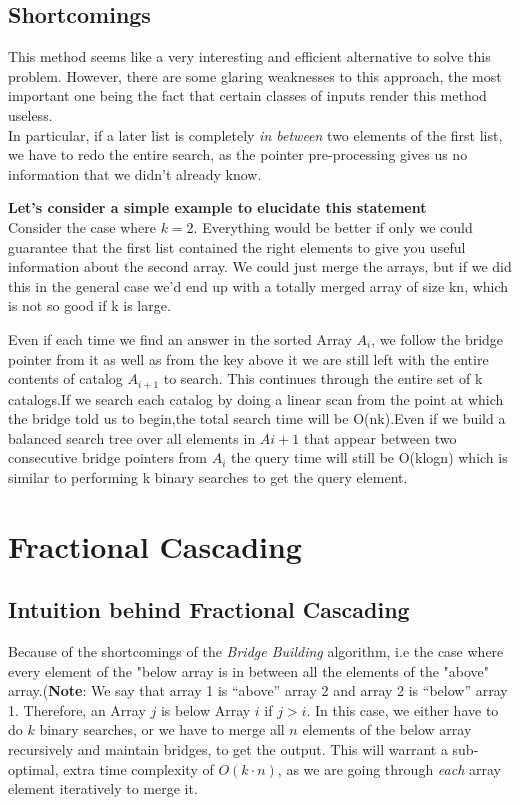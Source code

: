 \documentclass[11pt]{article}
\begin{document}
\subsection{Shortcomings}

This method seems like a very interesting and efficient alternative to solve this problem. However, there are some glaring weaknesses to this approach, the most important one being the fact that certain classes of inputs render this method useless. \\
In particular, if a later list is completely \textit{in between} two elements of the first list, we have to redo the entire search, as the pointer pre-processing gives us no information that we didn't already know.

\textbf{Let's consider a simple example to elucidate this statement} \\
Consider the case where $k = 2$. Everything would be better if only we could guarantee that the first list contained the right elements to give you useful information about the second array. We could just merge the arrays, but if we did this in the general case we'd end up with a totally merged array of size kn, which is not so good if k is large.

Even if each time we find an answer in the sorted Array $A_i$, we follow the bridge pointer from it as well as from the key above it we are still left with the entire contents of catalog $A_{i+1}$ to search. This continues through the entire set of k catalogs.If we search each catalog by doing a linear scan from the point at which the bridge told us to begin,the total search time will be O(nk).Even if we build a balanced search tree over all elements in $A{i+1}$ that appear between two consecutive bridge pointers from $A_i$ the query time will still be O(klogn) which is similar to performing k binary searches to get the query element.



\section{Fractional Cascading}

\subsection{Intuition behind Fractional Cascading}
Because of the shortcomings of the \textit{Bridge Building} algorithm, i.e the case where every element of the "below array is in between all the elements of the "above" array.(\textbf{Note}: We say that array 1 is “above” array 2 and array 2 is “below” array 1. Therefore, an Array $j$ is below Array $i$ if $j > i$. In this case, we either have to do $k$ binary searches, or we have to merge all $n$ elements of the below array recursively and maintain bridges, to get the output. This will warrant a sub-optimal, extra time complexity of $O(k \cdot n)$, as we are going through \textit{each} array element iteratively to merge it.
\end{document}
